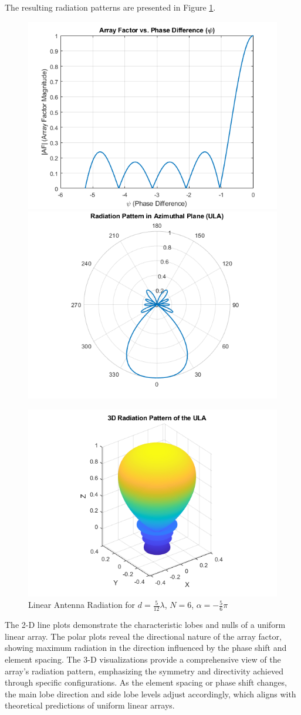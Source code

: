 \documentclass[a4paper, 12pt, english]{article}
\begin{document}
The resulting radiation patterns are presented in Figure \ref{fig:ula 2}.
\begin{figure}[H]
    \centering
         \includegraphics[width=0.49\linewidth]{report/images/ula_2D_2.png}
         \hfill
         \includegraphics[width=0.49\linewidth]{report/images/ula_2D_rad_2.png}
         \hfill

         \includegraphics[width=0.49\linewidth]{report/images/ula_3D_2.png}
         \caption{Linear Antenna Radiation for $ {d} = {\frac{5}{12}}{\lambda} $, $ {N} = {6} $, $ {\alpha} = -{\frac{5}{6}}{\pi} $}
         \label{fig:ula 2}
\end{figure}

The 2-D line plots demonstrate the characteristic lobes and nulls of a uniform linear array. The polar plots reveal the directional nature of the array factor, showing maximum radiation in the direction influenced by the phase shift and element spacing. The 3-D visualizations provide a comprehensive view of the array's radiation pattern, emphasizing the symmetry and directivity achieved through specific configurations.
\newline
\noindent
As the element spacing or phase shift changes, the main lobe direction and side lobe levels adjust accordingly, which aligns with theoretical predictions of uniform linear arrays.
\end{document}
